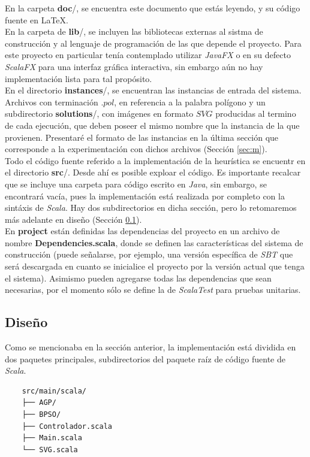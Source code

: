 \documentclass[12pt]{article}
\begin{document}
En la carpeta \textbf{doc}/, se encuentra este documento que estás
leyendo, y su código fuente en \LaTeX. \\

En la carpeta de \textbf{lib}/, se incluyen las bibliotecas externas al sistma de
construcción y al lenguaje de programación de las que depende el
proyecto. Para este proyecto en particular tenía contemplado utilizar \textit{JavaFX} o en su
defecto \textit{ScalaFX} para una interfaz gráfica interactiva, sin embargo aún no hay implementación lista para tal propósito.\\

En el directorio \textbf{instances}/, se encuentran las instancias de entrada del sistema. Archivos
con terminación $.pol$, en referencia a la palabra polígono y un subdirectorio \textbf{solutions}/,
con imágenes en formato $SVG$ producidas al termino de cada ejecución, que deben poseer el mismo
nombre que la instancia de la que provienen. Presentaré el formato de las instancias en la última
sección que corresponde a la experimentación con dichos archivos (Sección \ref{sec:m}).\\

Todo el código fuente referido a la implementación de la heurística
se encuentr en el directorio \textbf{src}/. Desde ahí es posible exploar
el código. Es importante recalcar que se incluye una carpeta para código
escrito en \textit{Java}, sin embargo, se encontrará vacía, pues la
implementación está realizada por completo con la sintáxis de \textit{Scala}. Hay dos subdirectorios en dicha sección, pero lo retomaremos más
adelante en diseño (Sección \ref{sec:c}).\\

En \textbf{project} están definidas las dependencias del proyecto en un
archivo de nombre \textbf{Dependencies.scala}, donde se definen las características del sistema de construcción (puede señalarse, por ejemplo, una versión específica de \textit{SBT} que será descargada en cuanto se inicialice el proyecto por la versión actual que tenga el sistema). Asimismo pueden agregarse todas las dependencias que sean necesarias, por el momento sólo se define la de \textit{ScalaTest} para pruebas unitarias.\\


\subsection{Diseño}\label{sec:c}
Como se mencionaba en la sección anterior, la implementación está dividida en dos paquetes principales, subdirectorios del paquete raíz de código fuente de \textit{Scala}.
\begin{verbatim}
    src/main/scala/
    ├── AGP/
    ├── BPSO/
    ├── Controlador.scala
    ├── Main.scala
    └── SVG.scala
\end{verbatim}
\end{document}

